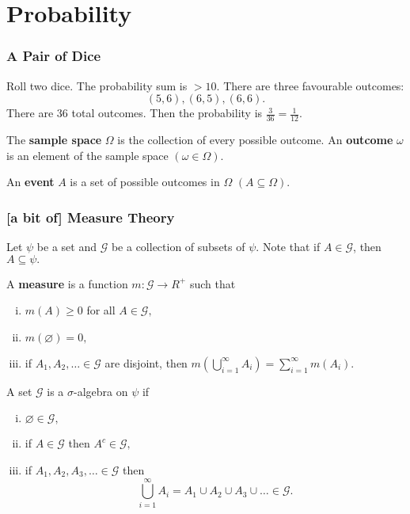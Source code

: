 
\chapter{Probability}
\subsection{A Pair of Dice}

\begin{eg}
Roll two dice. The probability sum is $>10.$ There are three favourable outcomes:
$$
(5,6), (6,5), (6,6).
$$
There are 36 total outcomes. Then the probability is $\frac{3}{36}=\frac{1}{12}.$
\end{eg}

\begin{definition}
The \textbf{sample space} $\Omega$ is the collection of every possible outcome. An \textbf{outcome} $\omega$ is an element of the sample space $(\omega \in \Omega).$
\end{definition}

\begin{definition}
An \textbf{event} $A$ is a set of possible outcomes in $\Omega$ $(A\subseteq \Omega).$
\end{definition}

\subsection{[a bit of] Measure Theory}

Let $\psi$ be a set and $\mathcal G$ be a collection of subsets of $\psi.$ Note that if $A\in \mathcal G$, then $A\subseteq \psi.$

\begin{definition}
A \textbf{measure} is a function $m:\mathcal G \to R^+$ such that
\begin{enumerate}[i.]
    \item $m(A)\geq 0$ for all $A\in \mathcal G,$
    \item $m(\varnothing)=0,$
    \item if $A_1,A_2,\ldots\in \mathcal G$ are disjoint, then $m\left(\bigcup^\infty_{i=1} A_i\right)=\sum^\infty_{i=1}m(A_i).$
\end{enumerate}
\end{definition}

\begin{definition}
A set $\mathcal G$ is a $\sigma$-algebra on $\psi$ if 
\begin{enumerate}[i.]
    \item $\varnothing\in\mathcal G,$
    \item if $A\in \mathcal G$ then $A^c\in \mathcal G,$
    \item if $A_1, A_2, A_3,\ldots\in \mathcal G$ then 
    $$
    \bigcup^\infty_{i=1}A_i=A_1\cup A_2\cup A_3\cup \ldots \in \mathcal G.
    $$
\end{enumerate}
\end{definition}


